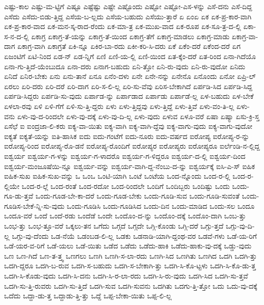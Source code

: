 {ಎಷ್ಟು-ಕಾಲ
ಎಷ್ಟು-ಮ-ಟ್ಟಿಗೆ
ಎಷ್ಟೂ
ಎಷ್ಟೆಷ್ಟು
ಎಷ್ಟೇ
ಎಷ್ಟೊಂದು
ಎಷ್ಟೋ
ಎಷ್ಟೋ-ಎಸ-ಳನ್ನು
ಎಸೆ-ದನು
ಎಸೆ-ದಿದ್ದ
ಎಸೆದು
ಎಸೆದು-ಬಿಡು-ತ್ತಿದ್ದ
ಎಸೆಯ-ಬ-ಲ್ಲದು
ಎಸೆಯ-ಬಹುದು
ಎಸೆಯು-ತ್ತಾರೆ
ಏ
ಏಂಏ
ಏಕ
ಏಕ-ಪ್ರ-ಕಾರ-ವಾಗಿ
ಏಕ-ಪ್ರ-ಕಾರ-ವಾದ
ಏಕ-ಮನ-ಸ್ಕ-ರಾದ-ರೆಂದು
ಏಕ-ಮಾ-ತ್ರ
ಏಕ-ಮುಖ-ವಾದ
ಏಕ-ರೂಪ
ಏಕ-ಸೂ-ತ್ರ-ದ-ಲ್ಲಿ
ಏಕಾ-ಸ-ನ-ದ-ಲ್ಲಿ
ಏಕಾಗ್ರ
ಏಕಾಗ್ರ-ತೆ-ಯನ್ನು
ಏಕಾಗ್ರ-ತೆ-ಯಿಂದ
ಏಕಾಗ್ರ-ತೆಗೆ
ಏಕಾಗ್ರ-ಮಾಡಲು
ಏಕಾಗ್ರ-ಮಾಡು
ಏಕಾಗ್ರ-ವಾ-ದಾಗ
ಏಕಾಗ್ರ-ವಾಗಿ
ಏಕಾಗ್ರತೆ
ಏಕಿ-ನ್ನೂ
ಏಕಿರ-ಬಾ-ರದು
ಏಕೀ-ಕರಿ-ಸಿ-ದರು
ಏಕೆ
ಏಕೆಂ-ದರೆ
ಏಕೆಂದ-ದರೆ
ಏಗ
ಏಜಂಟಿಗೆ
ಏಟಿ-ನಿಂದ
ಏಡ-ನ್
ಏಡ-ನ್ನಿಗೆ
ಏಣಿ
ಏಣಿ-ಯ-ಲ್ಲಿ
ಏಣಿ-ಯಿಂದ
ಏತ-ಕ್ಕೆಂ-ದರೆ
ಏತ-ರಿಂದ
ಏನಾ-ಗಿದೆಯೊ
ಏನಾ-ಗು-ತ್ತಿದೆ-ಯೆಂಬುದೂ
ಏನಾ-ದರು
ಏನಾಗ-ಬಹುದು
ಏನಿ-ತ್ತೋ
ಏನಿ-ರು-ವುದು
ಏನಿ-ರು-ವುದೋ
ಏನಿದು
ಏನಿದೆ
ಏನಿರ-ಬೇಕು
ಏನು
ಏನು-ತಾನೆ
ಏನೂ
ಏನೆಂ-ದಳು
ಏನೇ
ಏನೇ-ನನ್ನು
ಏನೇನೊ
ಏನೊಂದು
ಏನೋ
ಏಪ್ರಿ-ಲ್
ಏರಲು
ಏರಿ-ದರು
ಏರಿ-ದರೆ
ಏರಿ-ದಾಗ
ಏರಿ-ಸ-ಲಿ-ಲ್ಲ
ಏರಿ-ಸು-ವೆವು
ಏರಿಸ-ಬೇಕಾಗಿದೆ
ಏರ್ಪಡಿ-ಸಿದ
ಏರ್ಪಡಿ-ಸಿದ್ದ
ಏರ್ಪಡಿ-ಸಿದ್ದರು
ಏರ್ಪಡಿ-ಸು-ವುದು
ಏರ್ಪಾಡ-ನ್ನು
ಏರ್ಪಾಡಾದ
ಏರ್ಪಾಡು
ಏರ್ಪಾಡೆ-ಲ್ಲ
ಏಳ-ಬಹುದು
ಏಳ-ಬೇಕೆ
ಏಳಲಾ-ರವು
ಏಳಿ
ಏಳಿ-ಗೆಗೆ
ಏಳಿ-ಸು-ತ್ತಿ-ದ್ದರು
ಏಳು
ಏಳು-ತ್ತಿದ್ದವು
ಏಳು-ತ್ತಿದ್ದೆ
ಏಳು-ತ್ತಿವೆ
ಏಳು-ವಂ-ತಿ-ಲ್ಲ
ಏಳು-ವನು
ಏಳು-ವು-ದ-ರಿಂದಲೇ
ಏಳು-ವು-ದಕ್ಕೆ
ಏಳು-ವು-ದಿ-ಲ್ಲ
ಏಳು-ವುದು
ಏಳುವ
ಏಳೂ-ವರೆ
ಏಷಾ
ಏಷ್ಯಾ
ಏಸು-ಕ್ರಿ-ಸ್ತ
ಏಸೆಛೆ
ಐ
ಐಂದ್ರಜಾ-ಲಿ-ಕರು
ಐಕ್ಯ-ವಾ-ಯಿತು
ಐಕ್ಯ-ವಾಗಿ
ಐಕ್ಯ-ವಾಗಿ-ದ್ದೆವು
ಐಕ್ಯ-ವಾಗು-ವುದು
ಐಕ್ಯ-ವಾಗು-ವುದೋ
ಐಕ್ಯತೆ
ಐಕ್ಯತೆ-ಯನ್ನು
ಐತಿ-ಹಾಸಿಕ
ಐದು
ಐದು-ಗಂಟೆಗೆ
ಐದು-ನೂರು
ಐದು-ವರ್ಷದ
ಐರೋಪ್ಯ
ಐರೋಪ್ಯ-ರ-ನ್ನು
ಐರೋಪ್ಯ-ರಿಂದ
ಐರೋಪ್ಯ-ರೊ-ಡನೆ
ಐರೋಪ್ಯ-ರೊಂದಿಗೆ
ಐರೋಪ್ಯರ
ಐರೋಪ್ಯರು
ಐರೋಪ್ಯರೂ
ಐರ್ಲೆಂಡಿ-ನ-ಲ್ಲಿದ್ದ
ಐಶ್ವರ್ಯ
ಐಶ್ವರ್ಯ-ಗ-ಳನ್ನು
ಐಶ್ವರ್ಯ-ಗ-ಳಾದರೊ
ಐಶ್ವರ್ಯ-ಗ-ಳಿದ್ದರೂ
ಐಶ್ವರ್ಯ-ದ-ಲ್ಲಿ
ಐಶ್ವರ್ಯ-ದಿಂದ
ಐಶ್ವರ್ಯ-ಮಂಜೂಷೆಯಿ-ನ್ನೂ
ಐಶ್ವರ್ಯ-ವನ್ನು
ಐಶ್ವರ್ಯ-ವಾಗಿ-ದ್ದ-ನೆಂಬು-ದ-ನ್ನು
ಐಶ್ವರ್ಯಕ್ಕೆ
ಐಸಿ-ಎ-ಸ್
ಐಹಿಕ
ಐಹಿಕ-ಸುಖ
ಐಹಿಕ-ಸುಖ-ವನ್ನು
ಒ
ಒಂಒ
ಒಂಟಿ-ಯಾಗಿ
ಒಂಟೆ
ಒಂಟೆಯ
ಒಂದ-ನ್ನೊಂದು
ಒಂದ-ರ-ಲ್ಲಿ
ಒಂದ-ರ-ಲ್ಲಿಯೇ
ಒಂದ-ರ-ಲ್ಲೆ
ಒಂದ-ರಂತೆ
ಒಂದ-ರದೋ
ಒಂದ-ರಿಂದಲೇ
ಒಂದಿಗೆ
ಒಂದಿಬ್ಬರು
ಒಂದಿಷ್ಟು
ಒಂದು
ಒಂದು-ಗೂ-ಡು-ತ್ತವೆ
ಒಂದು-ಗೂಡ-ಬೇ-ಕಾ-ದರೆ
ಒಂದು-ಗೂಡ-ಬೇಕು
ಒಂದು-ಗೂಡಿ-ಸುವ
ಒಂದು-ಗೂಡಿ-ಸುವಂತೆ
ಒಂದು-ಗೂಡಿಸ-ಬೇಕೆ-ನ್ನಿ-ಸು-ವುದು
ಒಂದು-ಗೂಡಿಸಿ
ಒಂದು-ಗೂಡಿಸಿದ
ಒಂದು-ದಿನ
ಒಂದು-ಮಾಡಿದ
ಒಂದು-ಸಲ
ಒಂದೂ
ಒಂದೂ-ವರೆ
ಒಂದೆ
ಒಂದೆ-ರಡು
ಒಂದೆಡೆ
ಒಂದೇ
ಒಂದೊಂ-ದ-ನ್ನು
ಒಂದೊಂ-ದಕ್ಕೆ
ಒಂದೊಂ-ದಾಗಿ
ಒಂಬ-ತ್ತು
ಒಂಭ-ತ್ತು
ಒಂಭ-ತ್ತೂ-ವರೆ
ಒಕ್ಕಲು-ತನ
ಒಗೆದು
ಒಗ್ಗದೆ
ಒಗ್ಗದೇ
ಒಗ್ಗಿ-ಕೊಂಡು
ಒಗ್ಗಿ-ದರೆ
ಒಗ್ಗು-ತ್ತದೆ
ಒಗ್ಗು-ವು-ದಿ-ಲ್ಲ
ಒಗ್ಗು-ವು-ದೆಂದು
ಒಡ-ನೆಯೆ
ಒಡಂಬಡ-ಲಿ-ಲ್ಲ
ಒಡಕು
ಒಡನಾಡಿ-ಯಾಗಿ-ದ್ದಂಥ-ವರ
ಒಡವೆ-ಗಳು
ಒಡೆ-ಯ-ರಿಗೆ
ಒಡೆ-ಯರ-ವ-ರಿಗೆ
ಒಡೆ-ಯಲು
ಒಡೆ-ಯಿತು
ಒಡೆದ
ಒಡೆದು
ಒಡೆದು-ಹಾಕಿ
ಒಡೆದು-ಹಾಕು-ವು-ದಕ್ಕೆ
ಒಡ್ಡು-ವುದು
ಒಣ
ಒಣ-ಗಿದೆ
ಒಣ-ತ-ತ್ತ್ವ
ಒಣಗಲು
ಒಣಗಿ
ಒಣಗಿ-ಸ-ಲಾ-ರದು
ಒಣಗಿ-ಸಿದ
ಒಣಗಿತು
ಒಣಗಿದ
ಒದಗಿ
ಒದಗಿ-ತ್ತು
ಒದಗಿ-ದ್ದರೂ
ಒದಗಿ-ಬ-ರುವ
ಒದಗಿ-ಸ-ಬಹುದು
ಒದಗಿ-ಸ-ಬೇಕಾಗಿ-ತ್ತು
ಒದಗಿ-ಸಿ-ಕೊ-ಟ್ಟಳು
ಒದಗಿ-ಸಿ-ಕೊ-ಡು-ತ್ತ
ಒದಗಿ-ಸಿ-ಕೊಡು-ವುದು
ಒದಗಿ-ಸಿ-ದನು
ಒದಗಿ-ಸಿ-ರ-ಲಾ-ರದು
ಒದಗಿ-ಸಿ-ರು-ವುದು
ಒದಗಿ-ಸಿದ
ಒದಗಿ-ಸು-ತ್ತವೆ
ಒದಗಿ-ಸು-ತ್ತಿ-ರುವರು
ಒದಗಿ-ಸು-ತ್ತಿದೆ
ಒದಗಿ-ಸುವ
ಒದಗಿ-ಸುವನು
ಒದಗಿತು
ಒದಗು-ತ್ತಿ-ತ್ತೋ
ಒದು
ಒದು-ವು-ದಕ್ಕೆ
ಒದೆದು
ಒದ್ದಾ-ಡು-ತ್ತ
ಒದ್ದಾಡು-ತ್ತಿ-ತ್ತು
ಒದ್ದೆ
ಒಪ್ಪ-ಬೇಕಾ-ಯಿತು
ಒಪ್ಪ-ಲಿ-ಲ್ಲ
}
